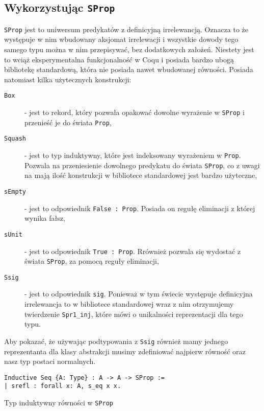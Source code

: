 \subsection{Wykorzystując \texttt{SProp}}
\texttt{SProp} jest to uniwersum predykatów z definicyjną irrelewancją. Oznacza to że występuje w nim wbudowany aksjomat irrelewacji i wszystkie dowody tego samego typu można w nim przepisywać, bez dodatkowych założeń. Niestety jest to wciąż eksperymentalna funkcjonalność w Coqu i posiada bardzo ubogą bibliotekę standardową, która nie posiada nawet wbudowanej równości. Posiada natomiast kilka użytecznych konstrukcji:
\begin{description}
    \item[\texttt{Box}] - jest to rekord, który pozwala opakować dowolne wyrażenie w \texttt{SProp} i przenieść je do świata \texttt{Prop},
    \item[\texttt{Squash}] - jest to typ induktywny, które jest indeksowany wyrażeniem w \texttt{Prop}. Pozwala na przeniesienie dowolnego predykatu do świata \texttt{SProp}, co z uwagi na mają ilość konstrukcji w bibliotece standardowej jest bardzo użyteczne,
    \item[\texttt{sEmpty}] - jest to odpowiednik \texttt{False : Prop}. Posiada on regułę eliminacji z której wynika fałsz,
    \item[\texttt{sUnit}] - jest to odpowiednik \texttt{True : Prop}. Rrównież pozwala się wydostać z świata \texttt{SProp}, za pomocą reguły eliminacji,
    \item[\texttt{Ssig}] - jest to odpowiednik \texttt{sig}. Ponieważ w tym świecie występuje definicyjna irrelewancja to w bibliotece standardowej wraz z nim otrzymujemy twierdzenie \texttt{Spr1_inj}, które mówi o unikalności reprezentacji dla tego typu.
\end{description}
Aby pokazać, że używając podtypowania z \texttt{Ssig} również mamy jednego reprezentanta dla klasy abstrakcji musimy zdefiniować najpierw równość oraz nasz typ postaci normalnych.
\begin{code}
\begin{verbatim}
Inductive Seq {A: Type} : A -> A -> SProp :=
| srefl : forall x: A, s_eq x x.
\end{verbatim}
\caption{Typ induktywny równości w \texttt{SProp}}
\label{SEq}
\end{code}

